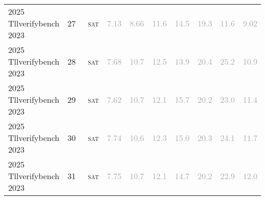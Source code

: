 \begin{center}
{\begin{longtable}{@{}llllllllll@{}}
2025 Tllverifybench 2023 & 27 & ~\textsc{sat} & \textcolor{darkgray}{7.13} & \textcolor{darkgray}{8.66} & \textcolor{darkgray}{11.6} & \textcolor{darkgray}{14.5} & \textcolor{darkgray}{19.3} & \textcolor{darkgray}{11.6} & \textcolor{darkgray}{9.02} \\
2025 Tllverifybench 2023 & 28 & ~\textsc{sat} & \textcolor{darkgray}{7.68} & \textcolor{darkgray}{10.7} & \textcolor{darkgray}{12.5} & \textcolor{darkgray}{13.9} & \textcolor{darkgray}{20.4} & \textcolor{darkgray}{25.2} & \textcolor{darkgray}{10.9} \\
2025 Tllverifybench 2023 & 29 & ~\textsc{sat} & \textcolor{darkgray}{7.62} & \textcolor{darkgray}{10.7} & \textcolor{darkgray}{12.1} & \textcolor{darkgray}{15.7} & \textcolor{darkgray}{20.2} & \textcolor{darkgray}{23.0} & \textcolor{darkgray}{11.4} \\
2025 Tllverifybench 2023 & 30 & ~\textsc{sat} & \textcolor{darkgray}{7.74} & \textcolor{darkgray}{10.6} & \textcolor{darkgray}{12.3} & \textcolor{darkgray}{15.0} & \textcolor{darkgray}{20.3} & \textcolor{darkgray}{24.1} & \textcolor{darkgray}{11.7} \\
2025 Tllverifybench 2023 & 31 & ~\textsc{sat} & \textcolor{darkgray}{7.75} & \textcolor{darkgray}{10.7} & \textcolor{darkgray}{12.1} & \textcolor{darkgray}{14.7} & \textcolor{darkgray}{20.2} & \textcolor{darkgray}{22.9} & \textcolor{darkgray}{12.0} \\
\bottomrule
\end{longtable}
}
\end{center}


